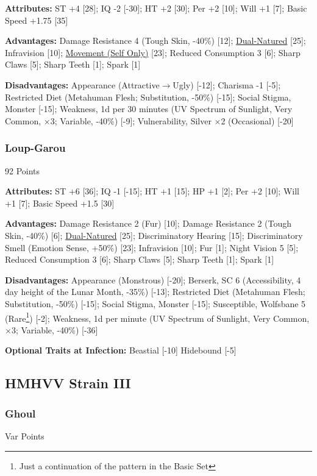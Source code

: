 \begin{multicols*}{3}
	\textbf{Attributes:}
	ST +4 [28]; IQ -2 [-30]; HT +2 [30]; Per +2 [10]; Will +1 [7]; Basic Speed +1.75 [35]
	
	\textbf{Advantages:}
	Damage Resistance 4 (Tough Skin, -40\%) [12]; \hyperref[dual_natured]{Dual-Natured} [25]; Infravision [10]; \hyperref[movement]{Movement (Self Only)} [23]; Reduced Consumption 3 [6]; Sharp Claws [5]; Sharp Teeth [1]; Spark [1]
	
	\textbf{Disadvantages:}
	Appearance (Attractive$\rightarrow$Ugly) [-12]; Charisma -1 [-5]; Restricted Diet (Metahuman Flesh; Substitution, -50\%) [-15]; Social Stigma, Monster [-15]; Weakness, 1d per 30 minutes (UV Spectrum of Sunlight, Very Common, $\times$3; Variable, -40\%) [-9]; Vulnerability, Silver ×2 (Occasional) [-20]
	
	\subsubsection{Loup-Garou}\label{loup-garou}
	\begin{flushright}
		92 Points
	\end{flushright}
	
	\textbf{Attributes:}
	ST +6 [36]; IQ -1 [-15]; HT +1 [15]; HP +1 [2]; Per +2 [10]; Will +1 [7]; Basic Speed +1.5 [30] 
	
	\textbf{Advantages:}
	Damage Resistance 2 (Fur) [10]; Damage Resistance 2 (Tough Skin, -40\%) [6]; \hyperref[dual_natured]{Dual-Natured} [25]; Discriminatory Hearing [15]; Discriminatory Smell (Emotion Sense, +50\%) [23]; Infravision [10]; Fur [1]; Night Vision 5 [5]; Reduced Consumption 3 [6]; Sharp Claws [5]; Sharp Teeth [1]; Spark [1]
	
	\textbf{Disadvantages:}
	Appearance (Monstrous) [-20]; Berserk, SC 6 (Accessibility, 4 day height of the Lunar Month, -35\%) [-13]; Restricted Diet (Metahuman Flesh; Substitution, -50\%) [-15]; Social Stigma, Monster [-15]; Susceptible, Wolfsbane 5 (Rare\footnote{Just a continuation of the pattern in the Basic Set}) [-2]; Weakness, 1d per minute (UV Spectrum of Sunlight, Very Common, $\times$3; Variable, -40\%) [-36]
	
	\textbf{Optional Traits at Infection:}
	Beastial [-10]
	Hidebound [-5]	
	
	\subsection*{HMHVV Strain III}
		
	\subsubsection{Ghoul}\label{ghoul}
	\begin{flushright}
		Var Points
	\end{flushright}


\end{multicols*}
